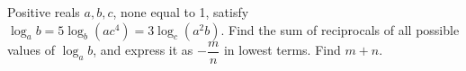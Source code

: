 Positive reals $a,b,c$, none equal to 1, satisfy $\log_ab=5\log_b(ac^4)=3\log_c(a^2b)$. Find the sum of reciprocals of all possible values of $\log_ab$, and express it as $-\dfrac{m}{n}$ in lowest terms. Find $m+n$.
